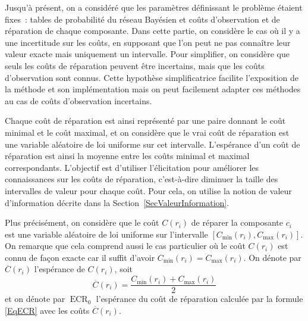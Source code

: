 \documentclass[a4paper,11pt]{article}
\theoremstyle{plain}
\DeclareMathOperator{\ECR}{ECR}
\begin{document}
Jusqu'à présent, on a considéré que les paramètres définissant le problème étaient fixes~: tables de probabilité du réseau Bayésien et coûts d'observation et de réparation de chaque composante. Dans cette partie, on considère le cas où il y a une incertitude sur les coûts, en supposant que l'on peut ne pas connaître leur valeur exacte mais uniquement un intervalle. Pour simplifier, on considère que seuls les coûts de réparation peuvent être incertains, mais que les coûts d'observation sont connus. Cette hypothèse simplificatrice facilite l'exposition de la méthode et son implémentation mais on peut facilement adapter ces méthodes au cas de coûts d'observation incertains.

Chaque coût de réparation est ainsi représenté par une paire donnant le coût minimal et le coût maximal, et on considère que le vrai coût de réparation est une variable aléatoire de loi uniforme sur cet intervalle. L'espérance d'un coût de réparation est ainsi la moyenne entre les coûts minimal et maximal correspondants. L'objectif est d'utiliser l'élicitation pour améliorer les connaissances sur les coûts de réparation, c'est-à-dire diminuer la taille des intervalles de valeur pour chaque coût. %
Pour cela, on utilise la notion de valeur d'information décrite dans la Section~\ref{SecValeurInformation}.

Plus précisément, on considère que le coût $C(r_i)$ de réparer la composante $c_i$ est une variable aléatoire de loi uniforme sur l'intervalle $[C_{\min}(r_i), C_{\max}(r_i)]$. On remarque que cela comprend aussi le cas particulier où le coût $C(r_i)$ est connu de façon exacte car il suffit d'avoir $C_{\min}(r_i) = C_{\max}(r_i)$. On dénote par $\overline C(r_i)$ l'espérance de $C(r_i)$, soit
\[\overline C(r_i) = \frac{C_{\min}(r_i) + C_{\max}(r_i)}{2}\]
et on dénote par $\ECR_0$ l'espérance du coût de réparation calculée par la formule \eqref{EqECR} avec les coûts $\overline C(r_i)$.
\end{document}
